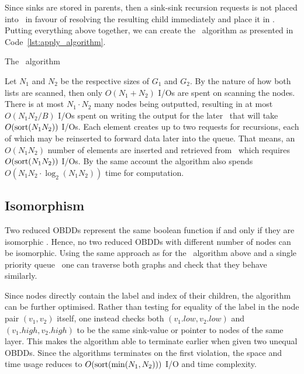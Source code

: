 Since sinks are stored in parents, then a sink-sink recursion requests is not
placed into \ApplyQrec\ in favour of resolving the resulting child immediately
and place it in \ReduceQdep. Putting everything above together, we can create
the \Apply\ algorithm as presented in Code~\ref{lst:apply_algorithm}.

\begin{lstfloat}[ht!]
  \centering

  

  \caption{The \Apply\ algorithm}
  \label{lst:apply_algorithm}
\end{lstfloat}

\clearpage
Let $N_1$ and $N_2$ be the respective sizes of $G_1$ and $G_2$. By the nature of
how both lists are scanned, then only $O(N_1 + N_2)$ I/Os are spent on scanning
the nodes. There is at most $N_1 \cdot N_2$ many nodes being outputted,
resulting in at most $O(N_1 N_2 / B)$ I/Os spent on writing the output for the
later \Reduce\ that will take $O(\text{sort}(N_1 N_2))$ I/Os. Each element creates up
to two requests for recursions, each of which may be reinserted to forward data
later into the queue. That means, an $O(N_1 N_2)$ number of elements are
inserted and retrieved from \ApplyQrec\ which requires $O(\text{sort}(N_1 N_2))$ I/Os.
By the same account the algorithm also spends $O(N_1 N_2 \cdot \log_2 (N_1 N_2))$
time for computation. \cite{Arge96}

\subsection{Isomorphism} \label{sec:theory__equal}
Two reduced OBDDs represent the same boolean function if and only if they are
isomorphic \cite[Theorem 1]{Bryant86}. Hence, no two reduced OBDDs with
different number of nodes can be isomorphic. Using the same approach as for the
\Apply\ algorithm above and a single priority queue \IsomorphicQrec\, one can
traverse both graphs and check that they behave similarly.

Since nodes directly contain the label and index of their children, the
algorithm can be further optimised. Rather than testing for equality of the
label in the node pair $(v_1,v_2)$ itself, one instead checks both
$(v_1.\mathit{low}, v_2.\mathit{low})$ and $(v_1.\mathit{high},
v_2.\mathit{high})$ to be the same sink-value or pointer to nodes of the same
layer. This makes the algorithm able to terminate earlier when given two unequal
OBDDs. Since the algorithms terminates on the first violation, the space and
time usage reduces to $O(\text{sort}(\min(N_1, N_2)))$ I/O and time complexity.

